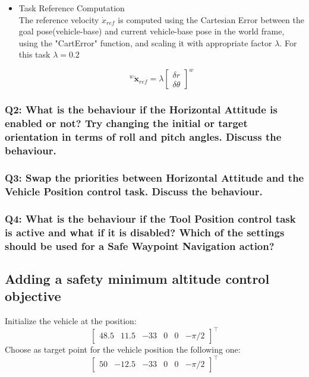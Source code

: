 \documentclass{article}
\begin{document}
\begin{itemize}
	
	\item Task Reference Computation \\
	The reference velocity $\dot{x}_{ref}$ is computed using the Cartesian Error between the goal pose(vehicle-base) and current vehicle-base pose in the world frame, using the "CartError" function, and scaling it with appropriate factor $\lambda$. For this task $\lambda = 0.2 $
	
	\begin{equation}
	^{w}\dot{\boldsymbol{x}}_{ref}=\lambda \left[\begin{array}{c}{\delta{r} } \\ {\delta{\theta}}\end{array}\right]^{w}
	\end{equation}
	
\end{itemize}

\subsubsection{Q2: What is the behaviour if the Horizontal Attitude is enabled or not? Try changing the initial or target orientation in terms of roll and pitch angles. Discuss the behaviour.}



\subsubsection{Q3: Swap the priorities between Horizontal Attitude and the Vehicle Position control task. Discuss the behaviour.}

\subsubsection{Q4: What is the behaviour if the Tool Position control task is active and what if it is disabled? Which of the settings should be used for a Safe Waypoint Navigation action?}


\subsection{Adding a safety minimum altitude control objective}
Initialize the vehicle at the position:
\begin{displaymath}
\begin{bmatrix} 48.5 & 11.5 & -33 & 0 & 0 &-\pi/2\end{bmatrix}^\top
\end{displaymath} 
Choose as target point for the vehicle position the following one:
\begin{displaymath}
\begin{bmatrix} 50 & -12.5 & -33 & 0 & 0 & -\pi/2 \end{bmatrix}^\top
\end{displaymath}
\end{document}
